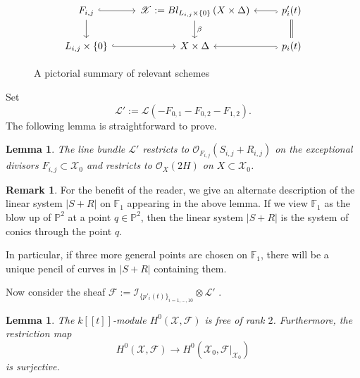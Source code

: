 \documentclass[reqno, 11pt]{amsart}
\theoremstyle{definition}
\theoremstyle{remark}
\numberwithin{equation}{section}
\numberwithin{thm}{section}
\numberwithin{prop}{section}
\numberwithin{lem}{section}
\numberwithin{cor}{section}
\numberwithin{conj}{section}
\numberwithin{defn}{section}
\newcommand{\F}{{\mathbb F}}
\renewcommand{\to}{\longrightarrow}
\theoremstyle{plain}
\newtheorem{lemma}[theorem]{Lemma}
\theoremstyle{definition}
\newtheorem{remark}[theorem]{Remark}
\newcommand\bp{{\mathbb P}}
\newcommand\so{{\mathscr O}}
\newcommand\scf{\mathscr F}
\newcommand\sci{\mathscr I}
\newcommand\scl{\mathscr L}
\newcommand\scx{\mathscr X}
\begin{document}
\begin{figure}
\begin{equation}
	\nonumber
  \begin{tikzcd} 
    F_{i,j} \ar{d} \arrow[hookrightarrow]{r} & \scx := Bl_{L_{i,j} \times \left\{ 0 \right\}} \left(  X \times \Delta\right) \ar {d}{\beta}  & p'_i(t) \arrow[hookrightarrow]{l} \\
     L_{i,j} \times \left\{ 0 \right\} \arrow[hookrightarrow]{r} & X \times \Delta 
     & p_i(t) \arrow[hookrightarrow]{l} \arrow[-,double equal sign distance]{u} 
  \end{tikzcd}\end{equation}
\caption{A pictorial summary of relevant schemes}
\end{figure}

Set \[\scl ' := \scl(-F_{0,1} - F_{0,2} - F_{1,2}).\]
The following lemma is straightforward to prove.

\begin{lemma}\label{lem:restrictionsofLprime}
The line bundle $\scl '$ restricts to $\so_{F_{i,j}}(S_{i,j} + R_{i,j})$ on the exceptional divisors $F_{i,j} \subset \scx_{0}$ and restricts to $\so_{X}(2H)$ on $X \subset \scx_{0}$.
\end{lemma}

\begin{remark}
For the benefit of the reader, we give an alternate description of the linear system $|S + R|$ on $\F_{1}$ appearing in the above lemma.  If we view $\F_{1}$ as the blow up of $\bp^{2}$ at a point $q \in \bp^{2}$, then the linear system $|S+R|$ is the system of conics through the point $q$.  

In particular, if three more general points are chosen on $\F_{1}$, there will be a unique pencil of curves in $|S+R|$ containing them.
\end{remark}



Now consider the sheaf $\scf := \sci_{\{p'_{i}(t)\}_{i=1, ..., 10}} \otimes \scl '$ . 

\begin{lemma}\label{lem:cohomologybasechange}
The $k[[t]]$-module $H^{0}(\scx, \scf)$ is free of rank $2$.  Furthermore, the restriction map \[H^{0}(\scx, \scf) \to H^{0}(\scx_{0}, \scf|_{\scx_{0}})\] is surjective.
\end{lemma}
\end{document}
